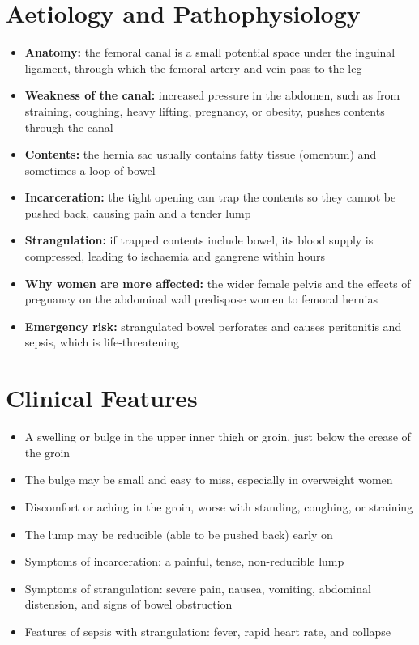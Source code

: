 \section*{Aetiology and Pathophysiology}
\begin{itemize}
    \item \textbf{Anatomy:} the femoral canal is a small potential space under the inguinal ligament, through which the femoral artery and vein pass to the leg
    \item \textbf{Weakness of the canal:} increased pressure in the abdomen, such as from straining, coughing, heavy lifting, pregnancy, or obesity, pushes contents through the canal
    \item \textbf{Contents:} the hernia sac usually contains fatty tissue (omentum) and sometimes a loop of bowel
    \item \textbf{Incarceration:} the tight opening can trap the contents so they cannot be pushed back, causing pain and a tender lump
    \item \textbf{Strangulation:} if trapped contents include bowel, its blood supply is compressed, leading to ischaemia and gangrene within hours
    \item \textbf{Why women are more affected:} the wider female pelvis and the effects of pregnancy on the abdominal wall predispose women to femoral hernias
    \item \textbf{Emergency risk:} strangulated bowel perforates and causes peritonitis and sepsis, which is life-threatening
\end{itemize}

\section*{Clinical Features}
\begin{itemize}
    \item A swelling or bulge in the upper inner thigh or groin, just below the crease of the groin
    \item The bulge may be small and easy to miss, especially in overweight women
    \item Discomfort or aching in the groin, worse with standing, coughing, or straining
    \item The lump may be reducible (able to be pushed back) early on
    \item Symptoms of incarceration: a painful, tense, non-reducible lump
    \item Symptoms of strangulation: severe pain, nausea, vomiting, abdominal distension, and signs of bowel obstruction
    \item Features of sepsis with strangulation: fever, rapid heart rate, and collapse
\end{itemize}


